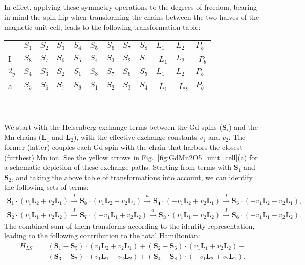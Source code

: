 In effect, applying these symmetry operations to the degrees of freedom, bearing in mind the spin flip when transforming the chains between the two halves of the magnetic unit cell, leads to the following transformation table:
\begin{table}[h]
\centering
\begin{tabular}{|l|lllllllllll|}
\cline{1-12}
 & $S_1$ & $S_2$ & $S_3$ & $S_4$ & $S_5$ & $S_6$ & $S_7$ & $S_8$ & $L_1$ & $L_2$ & $P_b$ \\ \cline{1-12}
I & $S_8$ & $S_7$ & $S_6$ & $S_5$ & $S_4$ & $S_3$ & $S_2$ & $S_1$ & -$L_1$ & $L_2$ & -$P_b$ \\ \cline{1-12}
$2_y$ & $S_4$ & $S_3$ & $S_2$ & $S_1$ & $S_8$ & $S_7$ & $S_6$ & $S_5$ & $L_1$ & $L_2$ & $P_b$ \\ \cline{1-12}
a & $S_5$ & $S_6$ & $S_7$ & $S_8$ & $S_1$ & $S_2$ & $S_3$ & $S_4$ & -$L_1$ & -$L_2$ & $P_b$ \\ \cline{1-12}
\end{tabular}
\end{table}\\\\
We start with the Heisenberg exchange terms between the Gd spins ($\bm{S}_i$) and the Mn chains ($\bm{L}_1$ and $\bm{L}_2$), with the effective exchange constants $v_1$ and $v_2$.
The former (latter) couples each Gd spin with the chain that harbors the closest (furthest) Mn ion. See the yellow arrows in Fig.~\ref{fig:GdMn2O5_unit_cell}(a) for a schematic depiction of these exchange paths.
Starting from terms with $\bm{S}_1$ and $\bm{S}_2$, and taking the above table of transformations into account, we can identify the following sets of terms:
\begin{align}
	\bm{S}_1\cdot(v_1 \bm{L}_2 + v_2 \bm{L}_1) \xrightarrow{I} \bm{S_8}\cdot(v_1 \bm{L}_2 - v_2 \bm{L}_1) \xrightarrow{a} \bm{S_4} \cdot (- v_1 \bm{L}_2 + v_2 \bm{L}_1) \xrightarrow{I} \bm{S_5} \cdot (-v_1 \bm{L}_2 - v_2 \bm{L}_1), \nonumber\\
	\bm{S}_2\cdot(v_1 \bm{L}_1 + v_2 \bm{L}_2) \xrightarrow{I} \bm{S_7}\cdot(-v_1 \bm{L}_1 + v_2 \bm{L}_2) \xrightarrow{a} \bm{S_3} \cdot (v_1 \bm{L}_1 - v_2 \bm{L}_2) \xrightarrow{I} \bm{S_6} \cdot (-v_1 \bm{L}_1 - v_2 \bm{L}_2).
\end{align}
The combined sum of them transforms according to the identity representation, leading to the following contribution to the total Hamiltonian:
\begin{align}
    H_{LS} =& (\bm{S}_1 - \bm{S}_5) \cdot (v_1 \bm{L}_2 + v_2 \bm{L}_1) + (\bm{S}_2 - \bm{S}_6) \cdot (v_1 \bm{L}_1 + v_2 \bm{L}_2) + \nonumber \\ &(\bm{S}_3 - \bm{S}_7) \cdot (v_1 \bm{L}_1 - v_2 \bm{L}_2) + (\bm{S}_4 - \bm{S}_8) \cdot (-v_1 \bm{L}_2 + v_2 \bm{L}_1).
\end{align}
